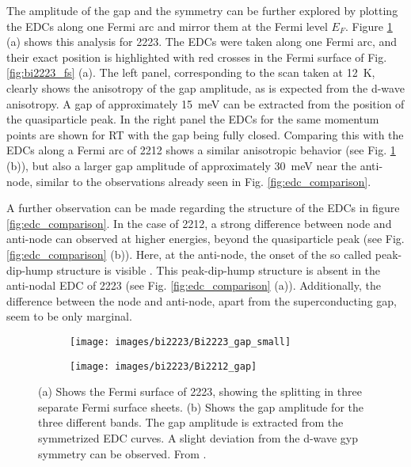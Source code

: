 The amplitude of the gap and the symmetry can be further explored by plotting the EDCs along one Fermi arc and mirror them at the Fermi level $E_F$.
Figure \ref{fig:gap_bilayer} (a) shows this analysis for 2223.
The EDCs were taken along one Fermi arc, and their exact position is highlighted with red crosses in the Fermi surface of Fig. \ref{fig:bi2223_fs} (a).
The left panel, corresponding to the scan taken at \qty{12}{\kelvin}, clearly shows the anisotropy of the gap amplitude, as is expected from the d-wave anisotropy.
A gap of approximately \qty{15}{\milli\electronvolt} can be extracted from the position of the quasiparticle peak.
In the right panel the EDCs for the same momentum points are shown for RT with the gap being fully closed.
Comparing this with the EDCs along a Fermi arc of 2212 shows a similar anisotropic behavior (see Fig. \ref{fig:gap_bilayer} (b)), but also a larger gap amplitude of approximately \qty{30}{\milli\electronvolt} near the anti-node, similar to the observations already seen in Fig. \ref{fig:edc_comparison}.

A further observation can be made regarding the structure of the EDCs in figure \ref{fig:edc_comparison}.
In the case of 2212, a strong difference between node and anti-node can observed at higher energies, beyond the quasiparticle peak (see Fig. \ref{fig:edc_comparison} (b)).
Here, at the anti-node, the onset of the so called peak-dip-hump structure is visible \cite{kordyuk_origin_2002}.
This peak-dip-hump structure is absent in the anti-nodal EDC of 2223 (see Fig. \ref{fig:edc_comparison} (a)).
Additionally, the difference between the node and anti-node, apart from the superconducting gap, seem to be only marginal.

\begin{figure}
	\centering
	\begin{subfigure}[b]{0.49\textwidth}
		\texttt{[image: images/bi2223/Bi2223\_gap\_small]}
		\caption{}
	\end{subfigure}
	\begin{subfigure}[b]{0.25\textwidth}
		\texttt{[image: images/bi2223/Bi2212\_gap]}
		\caption{}
	\end{subfigure}
	\caption{(a) Shows the Fermi surface of 2223, showing the splitting in three separate Fermi surface sheets. (b) Shows the gap amplitude for the three different bands. The gap amplitude is extracted from the symmetrized EDC curves. A slight deviation from the d-wave gyp symmetry can be observed. From \cite{luo_electronic_2023}.}
	\label{fig:gap_bilayer}
\end{figure}

